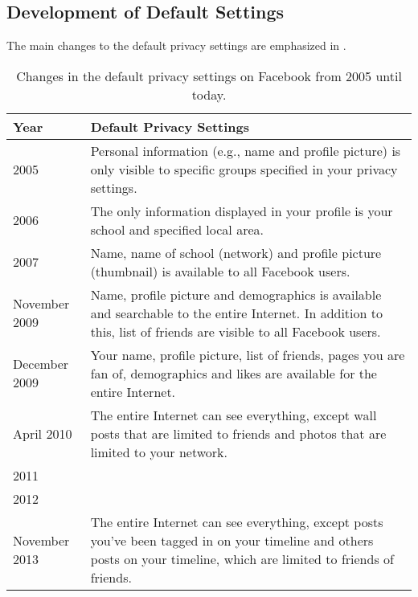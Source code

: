 \subsection{Development of Default Settings}




The main changes to the default privacy settings are emphasized in .

\begin{center}
\begin{table}[!ht]
\caption{\label{tab:dps}Changes in the default privacy settings on Facebook from 2005 until today. \cite{EvoPriv,PrivTimeline}}
    \begin{tabular}{ | l | p{9cm} |}
    \hline
    \textbf{Year} & \textbf{Default Privacy Settings} \\ 
    \hline
    2005 & Personal information (e.g., name and profile picture) is 	only visible to specific groups specified in your privacy 			settings.\\ 
    \hline
    2006 & The only information displayed in your profile is your 		school and specified local area. \\ 
    \hline
    2007 & Name, name of school (network) and profile picture 			(thumbnail) is available to all Facebook users.\\
    \hline
    November 2009 & Name, profile picture and demographics is 			available and searchable to the entire Internet. In addition to 	this, list of friends are visible to all Facebook users.\\
	\hline
    December 2009 & Your name, profile picture, list of friends, 		pages you are fan of, demographics and likes are available for 		the entire Internet.\\
    \hline
    April 2010 & The entire Internet can see everything, except 		wall posts that are limited to friends and photos that are 			limited to your network. \\
    \hline
    2011 &  \\
    \hline
    2012 & \\
    \hline
    November 2013 & The entire Internet can see everything, except posts you've been tagged in on your timeline and others posts on your timeline, which are limited to friends of friends. \\ 
    \hline
    \end{tabular}
   \end{table}
\end{center}  


